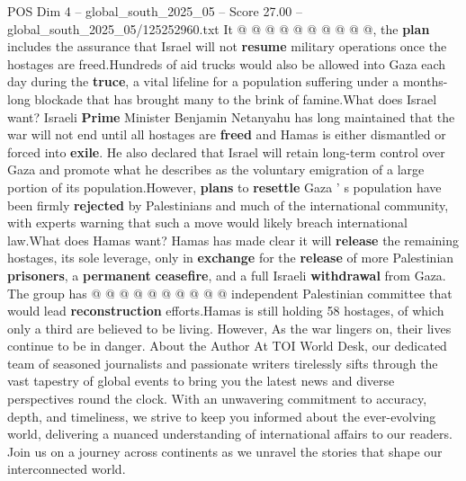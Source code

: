 \begin{textsample}{POS Dim 4 – global\_south\_2025\_05 – Score 27.00 – global\_south\_2025\_05/125252960.txt}
It @ @ @ @ @ @ @ @ @ @, the \textbf{plan} includes the assurance that Israel will not \textbf{resume} military operations once the hostages are freed.Hundreds of aid trucks would also be allowed into Gaza each day during the \textbf{truce}, a vital lifeline for a population suffering under a months-long blockade that has brought many to the brink of famine.What does Israel want?
Israeli \textbf{Prime} Minister Benjamin Netanyahu has long maintained that the war will not end until all hostages are \textbf{freed} and Hamas is either dismantled or forced into \textbf{exile}.
He also declared that Israel will retain long-term control over Gaza and promote what he describes as the voluntary emigration of a large portion of its population.However, \textbf{plans} to \textbf{resettle} Gaza ' s population have been firmly \textbf{rejected} by Palestinians and much of the international community, with experts warning that such a move would likely breach international law.What does Hamas want?
Hamas has made clear it will \textbf{release} the remaining hostages, its sole leverage, only in \textbf{exchange} for the \textbf{release} of more Palestinian \textbf{prisoners}, a \textbf{permanent} \textbf{ceasefire}, and a full Israeli \textbf{withdrawal} from Gaza.
The group has @ @ @ @ @ @ @ @ @ @ independent Palestinian committee that would lead \textbf{reconstruction} efforts.Hamas is still holding 58 hostages, of which only a third are believed to be living.
However, As the war lingers on, their lives continue to be in danger.
About the Author At TOI World Desk, our dedicated team of seasoned journalists and passionate writers tirelessly sifts through the vast tapestry of global events to bring you the latest news and diverse perspectives round the clock.
With an unwavering commitment to accuracy, depth, and timeliness, we strive to keep you informed about the ever-evolving world, delivering a nuanced understanding of international affairs to our readers.
Join us on a journey across continents as we unravel the stories that shape our interconnected world.

\end{textsample}
